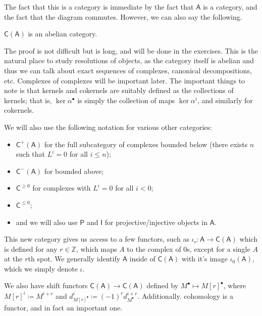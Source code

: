 The fact that this is a category is immediate by the fact that $\mathsf{A} $ is a category, and the fact that the diagram commutes. However, we can also say the following.
\begin{lemma}\label{lma:9.3.1}
	$\mathsf{C} (\mathsf{A} )$ is an abelian category.
\end{lemma}
The proof is not difficult but is long, and will be done in the exercises. This is the natural place to study resolutions of objects, as the category itself is abelian and thus we can talk about exact sequences of complexes, canonical decompositions, etc. Complexes of complexes will be important later. The important things to note is that kernels and cokernels are suitably defined as the collections of kernels; that is, $\ker \alpha ^\bullet $ is simply the collection of maps $\ker \alpha ^i$, and similarly for cokernels.

We will also use the following notation for various other categories:
\begin{itemize}
	\item $\mathsf{C} ^{+} (\mathsf{A} )$ for the full subcategory of complexes bounded below (there exists $n$ such that $L^i=0$ for all $i\leq n$);
	\item $\mathsf{C}^-(\mathsf{A} ) $ for bounded above;
	\item $\mathsf{C} ^{\geq 0} $ for complexes with $L^i=0$ for all $i<0$;
	\item $\mathsf{C} ^{\leq 0} $;
	\item and we will also use $\mathsf{P} $ and $\mathsf{I} $ for projective/injective objects in $\mathsf{A} $.
\end{itemize}

This new category gives us access to a few functors, such as $\iota _r : \mathsf{A}  \to \mathsf{C} (\mathsf{A} )$ which is defined for any $r\in\mathbb{Z} $, which maps $A$ to the complex of 0s, except for a single $A$ at the $r$th spot. We generally identify $\mathsf{A} $ inside of $\mathsf{C} (\mathsf{A} )$ with it's image $\iota_0(\mathsf{A} )$, which we simply denote $\iota $.

We also have shift functors $\mathsf{C} (\mathsf{A} )\to \mathsf{C} (\mathsf{A} )$ defined by $M^\bullet \mapsto M[r]^\bullet $, where $M[r]^i\coloneqq M^{i+r} $ and $d^i_{M[r]^\bullet } \coloneqq (-1)^r d^{i+r}_{M^\bullet } $. Additionally. cohomology is a functor, and in fact an important one.

